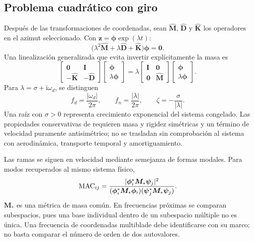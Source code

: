 \documentclass[oneside,a4paper,spanish,links,pagenumbers]{amca}
\newcommand{\I}{\bm I}
\begin{document}
\subsection{Problema cuadrático con giro}
Después de las transformaciones de coordenadas, sean $\widehat{\bm M}$, $\widehat{\bm D}$ y $\widehat{\bm K}$ los operadores en el azimut seleccionado. Con $\bm z=\bm\phi\exp(\lambda t)$:
\begin{equation}
\boxed{\bigl(\lambda^2\widehat{\bm M}
+\lambda\widehat{\bm D}+\widehat{\bm K}\bigr)\bm\phi=\bm0.}
\end{equation}
Una linealización generalizada que evita invertir explícitamente la masa es
\begin{equation}
\begin{bmatrix}\bm0&\I\\-\widehat{\bm K}&-\widehat{\bm D}\end{bmatrix}
\begin{bmatrix}\bm\phi\\\lambda\bm\phi\end{bmatrix}
=\lambda
\begin{bmatrix}\I&\bm0\\\bm0&\widehat{\bm M}\end{bmatrix}
\begin{bmatrix}\bm\phi\\\lambda\bm\phi\end{bmatrix}.
\end{equation}
Para $\lambda=\sigma+\mathrm{i}\omega_d$, se distinguen
\begin{equation}
f_d=\frac{|\omega_d|}{2\pi},\qquad
f_n=\frac{|\lambda|}{2\pi},\qquad
\zeta=-\frac{\sigma}{|\lambda|}.
\end{equation}
Una raíz con $\sigma>0$ representa crecimiento exponencial del sistema congelado. Las propiedades conservativas de \citet[sección 4.7, ecuaciones 4.139--4.148]{meirovitch1997} requieren masa y rigidez simétricas y un término de velocidad puramente antisimétrico; no se trasladan sin comprobación al sistema con aerodinámica, transporte temporal y amortiguamiento.

Las ramas se siguen en velocidad mediante semejanza de formas modales. Para modos recuperados al mismo sistema físico,
\begin{equation}
{\rm MAC}_{ij}=
\frac{|\bm\phi_i^*\bm M_*\bm\psi_j|^2}
{(\bm\phi_i^*\bm M_*\bm\phi_i)(\bm\psi_j^*\bm M_*\bm\psi_j)}.
\end{equation}
$\bm M_*$ es una métrica de masa común. En frecuencias próximas se comparan subespacios, pues una base individual dentro de un subespacio múltiple no es única. Una frecuencia de coordenadas multiblade debe identificarse con su marco; no basta comparar el número de orden de dos autovalores.
\end{document}
